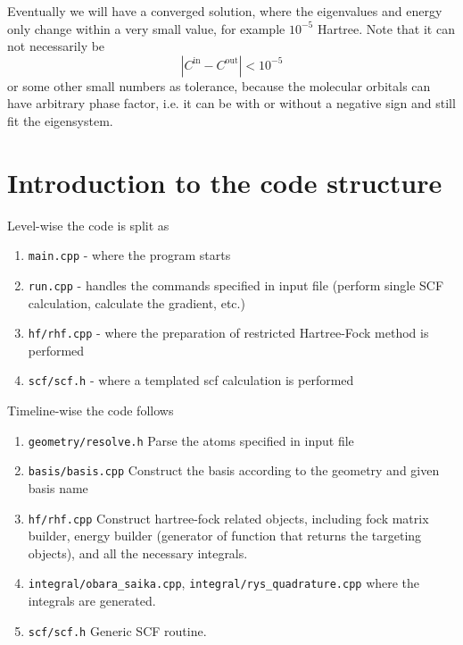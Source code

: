\documentclass[12pt,a4paper,openany,twoside]{article}
\numberwithin{equation}{section}
\begin{document}
Eventually we will have a converged solution, where the eigenvalues and energy only change within a very small value, for example $10^{-5}$ Hartree. Note that it can not necessarily be 
\begin{equation}
    | C^{\text{in}} - C^{\text{out}}| < 10^{-5}
\end{equation}
or some other small numbers as tolerance, because the molecular orbitals can have arbitrary phase factor, i.e. it can be with or without a negative sign and still fit the eigensystem.

\section{Introduction to the code structure}
Level-wise the code is split as
\begin{enumerate}
    \item \lstinline{main.cpp} - where the program starts \item \lstinline{run.cpp} - handles the commands specified in input file (perform single SCF calculation, calculate the gradient, etc.)
    \item \lstinline{hf/rhf.cpp} - where the preparation of restricted Hartree-Fock method is performed
    \item \lstinline{scf/scf.h} - where a templated scf calculation is performed 
\end{enumerate}
Timeline-wise the code follows
\begin{enumerate}
    \item \lstinline{geometry/resolve.h} Parse the atoms specified in input file
    \item \lstinline{basis/basis.cpp} Construct the basis according to the geometry and given basis name
    \item \lstinline{hf/rhf.cpp} Construct hartree-fock related objects, including fock matrix builder, energy builder (generator of function that returns the targeting objects), and all the necessary integrals.
    \item \lstinline{integral/obara_saika.cpp}, \lstinline{integral/rys_quadrature.cpp} where the integrals are generated.
    \item \lstinline{scf/scf.h} Generic SCF routine.
\end{enumerate}
\end{document}
